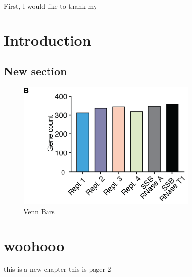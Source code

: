 \documentclass[12pt]{rockefeller}
\begin{document}
First, I would like to thank my  

\renewcommand\contentsname{Table of Contents}
\tableofcontents
\cleardoublepage
{}
{}
\listoffigures
\cleardoublepage
{}
{}
\listoftables

\printglossary[type=\acronymtype,nonumberlist,title={List of Abbreviations}]

\mainmatter
\pagestyle{fancy}
\fancyhf{}
\lhead{\chaptername\ \thechapter}
\rhead{\thesection}
\rfoot{\thepage}

\chapter{Introduction}
\section{New section}

\begin{figure}[!ht]%
\centering
\includegraphics[width=3.5in]{venn_bars.png}%
\caption{Venn Bars}%
\label{fVenn}%
\end{figure}

\newpage

\cite{Arimbasseri:2016ey}
\chapter{woohooo}
this is a new chapter\newpage
this is pager 2

\newpage
\renewcommand{\bibname}{References}


{} %
\end{document}
